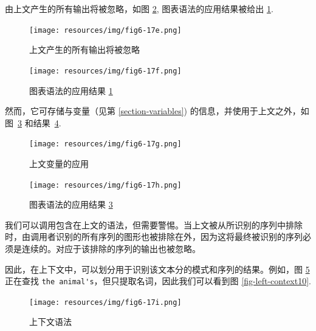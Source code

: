 \clearpage
\noindent 由上文产生的所有输出将被忽略，如图 \ref{fig-left-context6}, 图表语法的应用结果被给出 \ref{fig-left-context5}.

\begin{figure}[!ht]
\begin{center}
\texttt{[image: resources/img/fig6-17e.png]}
\caption{上文产生的所有输出将被忽略\label{fig-left-context5}}
\end{center}
\end{figure}

\begin{figure}[!ht]
\begin{center}
\texttt{[image: resources/img/fig6-17f.png]}
\caption{图表语法的应用结果
\ref{fig-left-context5}\label{fig-left-context6}}
\end{center}
\end{figure}

\bigskip
\noindent 然而，它可存储与变量（见第
\ref{section-variables}) 的信息，并使用于上文之外，如图~\ref{fig-left-context7} 和结果~\ref{fig-left-context8}.

\begin{figure}[!ht]
\begin{center}
\texttt{[image: resources/img/fig6-17g.png]}
\caption{上文变量的应用\label{fig-left-context7}}
\end{center}
\end{figure}

\begin{figure}[!ht]
\begin{center}
\texttt{[image: resources/img/fig6-17h.png]}
\caption{图表语法的应用结果
\ref{fig-left-context7}\label{fig-left-context8}}
\end{center}
\end{figure}

\bigskip
\noindent 我们可以调用包含在上文的语法，但需要警惕。当上文被从所识别的序列中排除时，由调用者识别的所有序列的图形也被排除在外，因为这将最终被识别的序列必须是连续的。对应于该排除的序列的输出也被忽略。

\bigskip
\noindent 因此，在上下文中，可以划分用于识别该文本分的模式和序列的结果。例如，图 \ref{fig-left-context9} 正在查找 \verb$the animal's$，但只提取名词，因此我们可以看到图 \ref{fig-left-context10}.

\begin{figure}[!ht]
\begin{center}
\texttt{[image: resources/img/fig6-17i.png]}
\caption{上下文语法\label{fig-left-context9}}
\end{center}
\end{figure}

